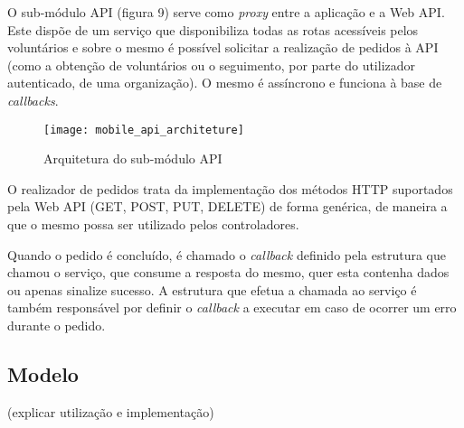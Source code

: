 O sub-módulo API (figura 9) serve como \textit{proxy} entre a aplicação e a Web API. Este dispõe de um serviço que disponibiliza todas as rotas acessíveis pelos voluntários e sobre o mesmo é possível solicitar a realização de pedidos à API (como a obtenção de voluntários ou o seguimento, por parte do utilizador autenticado, de uma organização). O mesmo é assíncrono e funciona à base de \textit{callbacks}.

\begin{figure}[h]
	\centering
	\texttt{[image: mobile\_api\_architeture]}
	\caption{Arquitetura do sub-módulo API}
\end{figure}

O realizador de pedidos trata da implementação dos métodos HTTP suportados pela Web API (GET, POST, PUT, DELETE) de forma genérica, de maneira a que o mesmo possa ser utilizado pelos controladores.

Quando o pedido é concluído, é chamado o \textit{callback} definido pela estrutura que chamou o serviço, que consume a resposta do mesmo, quer esta contenha dados ou apenas sinalize sucesso. A estrutura que efetua a chamada ao serviço é também responsável por definir o \textit{callback} a executar em caso de ocorrer um erro durante o pedido.

\subsection{Modelo}

(explicar utilização e implementação)

